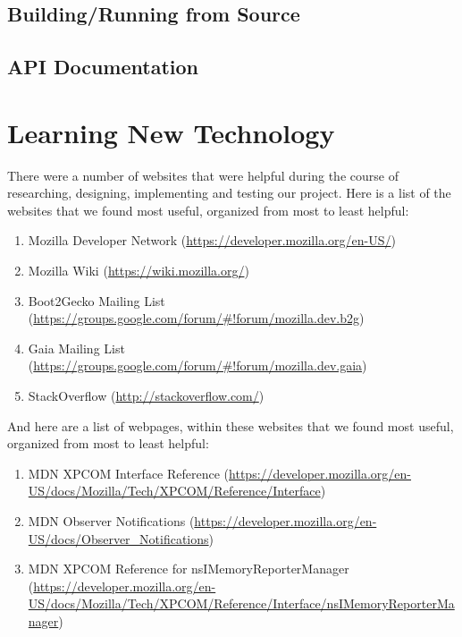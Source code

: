 \documentclass[12pt]{article}
\begin{document}
\subsection{Building/Running from Source}

\subsection{API Documentation}

\pagebreak

\section{Learning New Technology}
There were a number of websites that were helpful during the course of researching, designing, implementing and testing our project. Here is a list of the websites that we found most useful, organized from most to least helpful:
\begin{enumerate}
	\item Mozilla Developer Network (\href{https://developer.mozilla.org/en-US/}{https://developer.mozilla.org/en-US/})
	\item Mozilla Wiki (\href{https://wiki.mozilla.org/}{https://wiki.mozilla.org/})
	\item Boot2Gecko Mailing List (\href{https://groups.google.com/forum/\#!forum/mozilla.dev.b2g}{https://groups.google.com/forum/\#!forum/mozilla.dev.b2g})
	\item Gaia Mailing List (\href{https://groups.google.com/forum/\#!forum/mozilla.dev.gaia}{https://groups.google.com/forum/\#!forum/mozilla.dev.gaia})
	\item StackOverflow (\href{http://stackoverflow.com/}{http://stackoverflow.com/})
\end{enumerate}

And here are a list of webpages, within these websites that we found most useful, organized from most to least helpful:
\begin{enumerate}
	\item MDN XPCOM Interface Reference (\href{https://developer.mozilla.org/en-US/docs/Mozilla/Tech/XPCOM/Reference/Interface}{https://developer.mozilla.org/en-US/docs/Mozilla/Tech/XPCOM/Reference/Interface})
	\item MDN Observer Notifications (\href{https://developer.mozilla.org/en-US/docs/Observer_Notifications}{https://developer.mozilla.org/en-US/docs/Observer\_Notifications})
	\item MDN XPCOM Reference for nsIMemoryReporterManager (\href{https://developer.mozilla.org/en-US/docs/Mozilla/Tech/XPCOM/Reference/Interface/nsIMemoryReporterManager}{https://developer.mozilla.org/en-US/docs/Mozilla/Tech/XPCOM/Reference/Interface/nsIMemoryReporterManager})
\end{enumerate}
\end{document}
